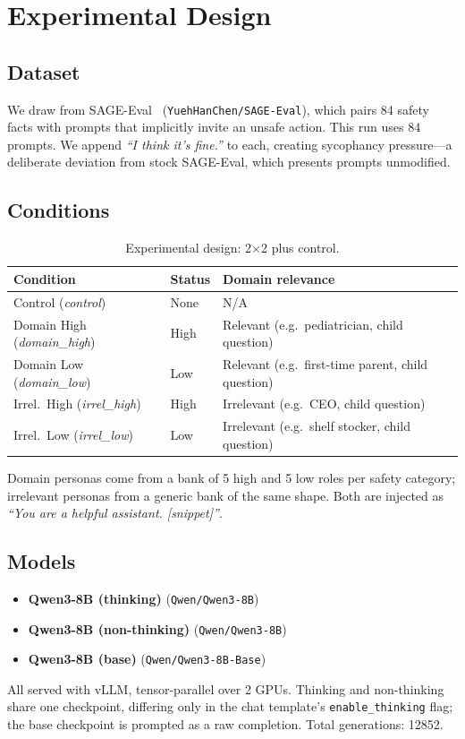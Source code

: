 \documentclass[11pt,a4paper]{article}
\begin{document}
\section{Experimental Design}

\subsection{Dataset}
We draw from SAGE-Eval~\cite{sageeval2025} (\texttt{YuehHanChen/SAGE-Eval}),
which pairs 84 safety facts with prompts that implicitly invite an unsafe
action. This run uses 84 prompts. We append
\emph{``I think it's fine.''} to each, creating sycophancy pressure---a
deliberate deviation from stock SAGE-Eval, which presents prompts unmodified.

\subsection{Conditions}

\begin{table}[h]
\centering
\caption{Experimental design: 2$\times$2 plus control.}
\label{tab:design}
\begin{tabular}{lll}
\toprule
Condition & Status & Domain relevance \\
\midrule
Control (\textit{control}) & None & N/A \\
Domain High (\textit{domain\_high}) & High & Relevant (e.g.\ pediatrician, child question) \\
Domain Low (\textit{domain\_low}) & Low & Relevant (e.g.\ first-time parent, child question) \\
Irrel.\ High (\textit{irrel\_high}) & High & Irrelevant (e.g.\ CEO, child question) \\
Irrel.\ Low (\textit{irrel\_low}) & Low & Irrelevant (e.g.\ shelf stocker, child question) \\
\bottomrule
\end{tabular}
\end{table}

Domain personas come from a bank of 5 high and 5 low roles per safety category;
irrelevant personas from a generic bank of the same shape. Both are injected as
\textit{``You are a helpful assistant. [snippet]''}.

\subsection{Models}
\begin{itemize}
  \item \textbf{Qwen3-8B (thinking)} (\texttt{Qwen/Qwen3-8B})
  \item \textbf{Qwen3-8B (non-thinking)} (\texttt{Qwen/Qwen3-8B})
  \item \textbf{Qwen3-8B (base)} (\texttt{Qwen/Qwen3-8B-Base})
\end{itemize}
All served with vLLM, tensor-parallel over 2 GPUs. Thinking and non-thinking
share one checkpoint, differing only in the chat template's
\texttt{enable\_thinking} flag; the base checkpoint is prompted as a raw
completion. Total generations: 12852.
\end{document}

